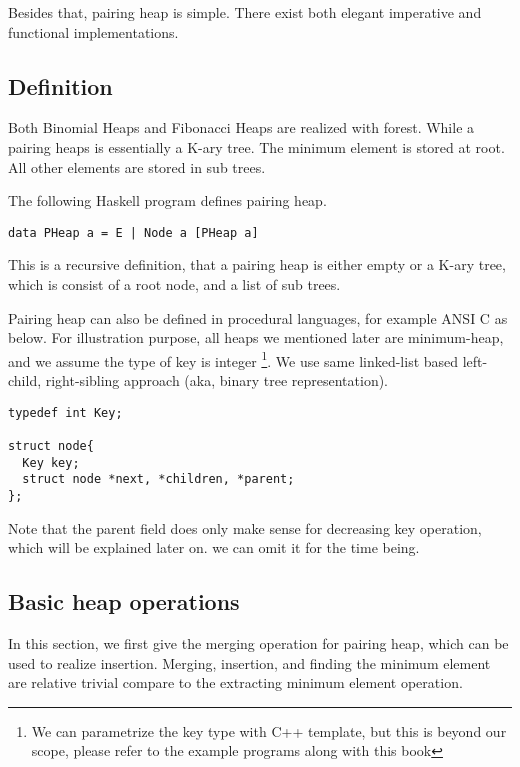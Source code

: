 \documentclass{article}
\begin{document}
Besides that, pairing heap is simple. There exist both elegant
imperative and functional implementations.

\subsection{Definition}

Both Binomial Heaps and Fibonacci Heaps are realized with forest.
While a pairing heaps is essentially a K-ary tree. The minimum element
is stored at root. All other elements are stored in sub trees.

The following Haskell program defines pairing heap.

\lstset{language=Haskell}
\begin{lstlisting}
data PHeap a = E | Node a [PHeap a]
\end{lstlisting}

This is a recursive definition, that a pairing heap is either empty
or a K-ary tree, which is consist of a root node, and a list of sub trees.

Pairing heap can also be defined in procedural languages, for example
ANSI C as below. For illustration purpose, all heaps we mentioned later
are minimum-heap, and we assume the type of key is integer \footnote{We
can parametrize the key type with C++ template, but this is beyond
our scope, please refer to the example programs along with
this book}. We use same linked-list based left-child, right-sibling
approach (aka, binary tree representation\cite{CLRS}).

\lstset{language=C}
\begin{lstlisting}
typedef int Key;

struct node{
  Key key;
  struct node *next, *children, *parent;
};
\end{lstlisting}

Note that the parent field does only make sense for decreasing key
operation, which will be explained later on. we can omit it for the
time being.


\subsection{Basic heap operations}
In this section, we first give the merging operation for pairing
heap, which can be used to realize insertion. Merging, insertion,
and finding the minimum element are relative trivial compare to
the extracting minimum element operation.
\end{document}
